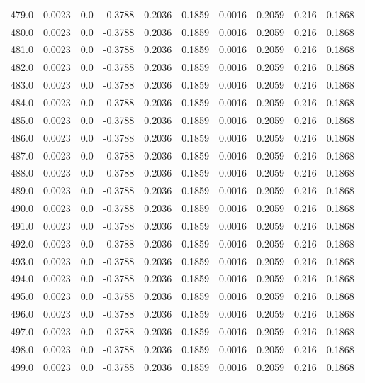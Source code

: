 \begin{longtable}{lrrrrrrrrr}
479.0 & 0.0023 & 0.0 & -0.3788 & 0.2036 & 0.1859 & 0.0016 & 0.2059 & 0.216 & 0.1868 \\
480.0 & 0.0023 & 0.0 & -0.3788 & 0.2036 & 0.1859 & 0.0016 & 0.2059 & 0.216 & 0.1868 \\
481.0 & 0.0023 & 0.0 & -0.3788 & 0.2036 & 0.1859 & 0.0016 & 0.2059 & 0.216 & 0.1868 \\
482.0 & 0.0023 & 0.0 & -0.3788 & 0.2036 & 0.1859 & 0.0016 & 0.2059 & 0.216 & 0.1868 \\
483.0 & 0.0023 & 0.0 & -0.3788 & 0.2036 & 0.1859 & 0.0016 & 0.2059 & 0.216 & 0.1868 \\
484.0 & 0.0023 & 0.0 & -0.3788 & 0.2036 & 0.1859 & 0.0016 & 0.2059 & 0.216 & 0.1868 \\
485.0 & 0.0023 & 0.0 & -0.3788 & 0.2036 & 0.1859 & 0.0016 & 0.2059 & 0.216 & 0.1868 \\
486.0 & 0.0023 & 0.0 & -0.3788 & 0.2036 & 0.1859 & 0.0016 & 0.2059 & 0.216 & 0.1868 \\
487.0 & 0.0023 & 0.0 & -0.3788 & 0.2036 & 0.1859 & 0.0016 & 0.2059 & 0.216 & 0.1868 \\
488.0 & 0.0023 & 0.0 & -0.3788 & 0.2036 & 0.1859 & 0.0016 & 0.2059 & 0.216 & 0.1868 \\
489.0 & 0.0023 & 0.0 & -0.3788 & 0.2036 & 0.1859 & 0.0016 & 0.2059 & 0.216 & 0.1868 \\
490.0 & 0.0023 & 0.0 & -0.3788 & 0.2036 & 0.1859 & 0.0016 & 0.2059 & 0.216 & 0.1868 \\
491.0 & 0.0023 & 0.0 & -0.3788 & 0.2036 & 0.1859 & 0.0016 & 0.2059 & 0.216 & 0.1868 \\
492.0 & 0.0023 & 0.0 & -0.3788 & 0.2036 & 0.1859 & 0.0016 & 0.2059 & 0.216 & 0.1868 \\
493.0 & 0.0023 & 0.0 & -0.3788 & 0.2036 & 0.1859 & 0.0016 & 0.2059 & 0.216 & 0.1868 \\
494.0 & 0.0023 & 0.0 & -0.3788 & 0.2036 & 0.1859 & 0.0016 & 0.2059 & 0.216 & 0.1868 \\
495.0 & 0.0023 & 0.0 & -0.3788 & 0.2036 & 0.1859 & 0.0016 & 0.2059 & 0.216 & 0.1868 \\
496.0 & 0.0023 & 0.0 & -0.3788 & 0.2036 & 0.1859 & 0.0016 & 0.2059 & 0.216 & 0.1868 \\
497.0 & 0.0023 & 0.0 & -0.3788 & 0.2036 & 0.1859 & 0.0016 & 0.2059 & 0.216 & 0.1868 \\
498.0 & 0.0023 & 0.0 & -0.3788 & 0.2036 & 0.1859 & 0.0016 & 0.2059 & 0.216 & 0.1868 \\
499.0 & 0.0023 & 0.0 & -0.3788 & 0.2036 & 0.1859 & 0.0016 & 0.2059 & 0.216 & 0.1868 \\

\end{longtable}

